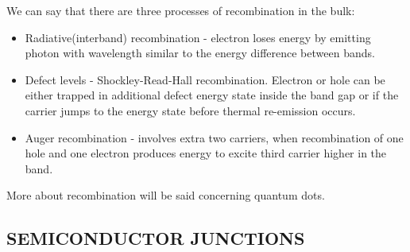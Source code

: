 We can say that there are three processes of recombination in the bulk:
\begin{itemize}
\item Radiative(interband) recombination - electron loses energy by emitting photon with wavelength similar to the energy difference between bands.
\item Defect levels - Shockley-Read-Hall recombination. Electron or hole can be either trapped in additional defect energy state inside the band gap or if the carrier jumps to the energy state before thermal re-emission occurs. 
\item Auger recombination - involves extra two carriers, when recombination of one hole and one electron produces energy to excite third carrier higher in the band. 
\end{itemize}

More about recombination will be said   concerning quantum dots.\cite{popko} \cite{pv}
\subsection{SEMICONDUCTOR JUNCTIONS}


